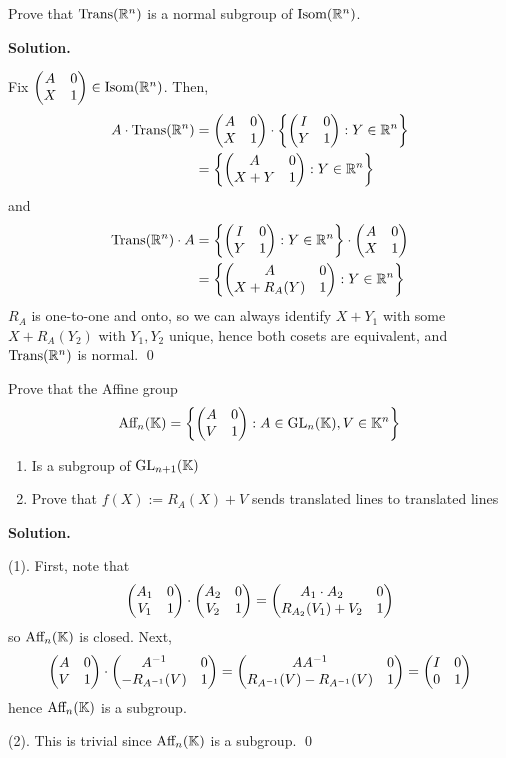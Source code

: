 \documentclass[12pt]{book}
\theoremstyle{definition}
\newenvironment{solution}
{%
  \par\noindent\textbf{Solution.}\quad
}
{%
  \qed\par
}
\begin{document}
\begin{taggedexercise}[\textcolor{red}{TODO}]

\end{taggedexercise}

\begin{taggedexercise}[\textcolor{red}{TODO}]

\end{taggedexercise}


\begin{taggedexercise}[\textcolor{green}{Complete}]
Prove that $\text{Trans}(\mathbb{R}^n)$ is a normal subgroup of $\text{Isom}(\mathbb{R}^n)$.
\end{taggedexercise}

\begin{solution}
  Fix $\begin{pmatrix} A & 0 \\ X & 1 \end{pmatrix} \in \text{Isom}(\mathbb{R}^n)$.
  Then,
  \[\begin{aligned}
    A \cdot \text{Trans}(\mathbb{R}^n) &= \begin{pmatrix} A & 0 \\ X & 1 \end{pmatrix} \cdot \left\{\begin{pmatrix} I & 0 \\ Y & 1 \end{pmatrix} : Y \in \mathbb{R}^n \right\} \\
                               &= \left\{\begin{pmatrix} A & 0 \\ X + Y & 1 \end{pmatrix} : Y \in \mathbb{R}^n \right\}
  \end{aligned}\]
  and
  \[\begin{aligned}
    \text{Trans}(\mathbb{R}^n) \cdot A &= \left\{\begin{pmatrix} I & 0 \\ Y & 1 \end{pmatrix} : Y \in \mathbb{R}^n \right\} \cdot \begin{pmatrix} A & 0 \\ X & 1 \end{pmatrix} \\
                               &= \left\{\begin{pmatrix} A & 0 \\ X + R_A(Y) & 1 \end{pmatrix} : Y \in \mathbb{R}^n \right\}
  \end{aligned}\]
  $R_A$ is one-to-one and onto, so we can always identify $X + Y_1$ with some $X + R_A(Y_2)$ with $Y_1, Y_2$ unique, hence both cosets are equivalent, and $\text{Trans}(\mathbb{R}^n)$ is normal.
\end{solution}

\begin{taggedexercise}[\textcolor{green}{Complete}]
Prove that the Affine group
\[
\text{Aff}_n(\mathbb{K}) = \left\{\begin{pmatrix} A & 0 \\ V & 1 \end{pmatrix} : A \in \mathrm{GL}_{n}(\mathbb{K}), V \in \mathbb{K}^n \right\}
\]
\begin{enumerate}
  \item Is a subgroup of $\mathrm{GL}_{n+1}(\mathbb{K})$
  \item Prove that $f(X) := R_A(X) + V$ sends translated lines to translated lines
\end{enumerate}
\end{taggedexercise}

\begin{solution}
  (1). First, note that
  \[
  \begin{pmatrix} A_1 & 0 \\ V_1 & 1 \end{pmatrix} \cdot \begin{pmatrix} A_2 & 0 \\ V_2 & 1 \end{pmatrix} = \begin{pmatrix} A_1 \cdot A_2 & 0 \\ R_{A_2}(V_1) + V_2 & 1 \end{pmatrix} 
  \]
  so $\text{Aff}_n(\mathbb{K})$ is closed.
  Next, 
  \[\begin{pmatrix} A & 0 \\ V & 1 \end{pmatrix} \cdot \begin{pmatrix} A^{-1} & 0 \\  - R_{A^{-1}}(V) & 1 \end{pmatrix} = \begin{pmatrix} AA^{-1} & 0 \\ R_{A^{-1}}(V) - R_{A^{-1}}(V) & 1 \end{pmatrix} = \begin{pmatrix} I & 0 \\ 0 & 1 \end{pmatrix}\]
  hence $\text{Aff}_n(\mathbb{K})$ is a subgroup.

  (2). This is trivial since $\text{Aff}_n(\mathbb{K})$ is a subgroup.
\end{solution}
\end{document}
